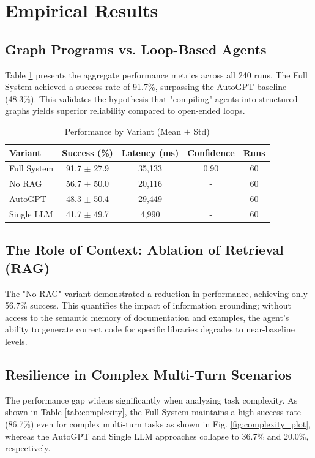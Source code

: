 \documentclass[lettersize,journal]{IEEEtran}
\begin{document}
\section{Empirical Results}

\subsection{Graph Programs vs. Loop-Based Agents}
Table \ref{tab:performance} presents the aggregate performance metrics across all 240 runs. The Full System achieved a success rate of 91.7\%, surpassing the AutoGPT baseline (48.3\%). This validates the hypothesis that "compiling" agents into structured graphs yields superior reliability compared to open-ended loops.

\begin{table}[H]
\centering
\caption{Performance by Variant (Mean $\pm$ Std)}
\label{tab:performance}
\begin{tabular}{lcccc}
\toprule
\textbf{Variant} & \textbf{Success (\%)} & \textbf{Latency (ms)} & \textbf{Confidence} & \textbf{Runs} \\
\midrule
Full System & 91.7 $\pm$ 27.9 & 35,133 & 0.90 & 60 \\
No RAG & 56.7 $\pm$ 50.0 & 20,116 & - & 60 \\
AutoGPT & 48.3 $\pm$ 50.4 & 29,449 & - & 60 \\
Single LLM & 41.7 $\pm$ 49.7 & 4,990 & - & 60 \\
\bottomrule
\end{tabular}
\end{table}

\subsection{The Role of Context: Ablation of Retrieval (RAG)}
The "No RAG" variant demonstrated a reduction in performance, achieving only 56.7\% success. This quantifies the impact of information grounding; without access to the semantic memory of documentation and examples, the agent's ability to generate correct code for specific libraries degrades to near-baseline levels.

\subsection{Resilience in Complex Multi-Turn Scenarios}
The performance gap widens significantly when analyzing task complexity. As shown in Table \ref{tab:complexity}, the Full System maintains a high success rate (86.7\%) even for complex multi-turn tasks as shown in Fig. \ref{fig:complexity_plot}, whereas the AutoGPT and Single LLM approaches collapse to 36.7\% and 20.0\%, respectively.
\end{document}
